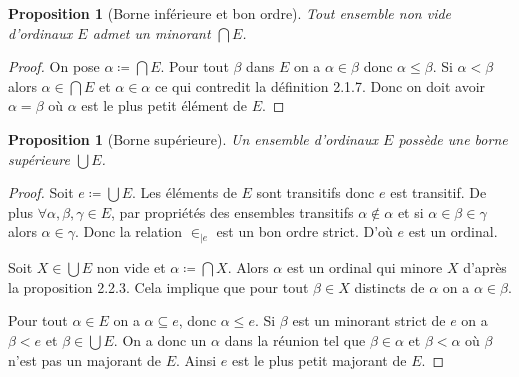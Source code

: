 \documentclass{article}
\theoremstyle{definition}
\theoremstyle{plain}
\newtheorem{proposition}[subsubsection]{Proposition}
\theoremstyle{plain}
\theoremstyle{plain}
\theoremstyle{plain}
\begin{document}
\begin{proposition}[Borne inférieure et bon ordre]
	Tout ensemble non vide d'ordinaux \( E\) admet un minorant \( \bigcap E \).
\end{proposition}
\begin{proof}
	On pose \( \alpha \coloneqq \bigcap E \). Pour tout \( \beta \) dans \( E \) on a \( \alpha \in \beta \) donc \( \alpha \le \beta \). Si \( \alpha < \beta \) alors \( \alpha \in \bigcap E \) et \( \alpha \in \alpha \) ce qui contredit la définition 2.1.7. Donc on doit avoir \( \alpha = \beta \) où \( \alpha \) est le plus petit élément de \( E \).
\end{proof}
\begin{proposition}[Borne supérieure]
	Un ensemble d'ordinaux \( E \) possède une borne supérieure \( \bigcup E \). 
\end{proposition}
\begin{proof}
	Soit \( e \coloneqq \bigcup E \). Les éléments de \( E \) sont transitifs donc \( e \) est transitif. De plus \( \forall \alpha, \beta, \gamma \in E \), par propriétés des ensembles transitifs \( \alpha \notin \alpha  \) et si \( \alpha \in \beta \in \gamma \) alors \( \alpha \in \gamma \). Donc la relation \( \in_{|e} \) est un bon ordre strict. D'où \( e \) est un ordinal.

	Soit \( X \in \bigcup E \) non vide et \( \alpha \coloneqq \bigcap X \). Alors \( \alpha \) est un ordinal qui minore \( X \) d'après la proposition 2.2.3. Cela implique que pour tout \( \beta \in X \) distincts de \( \alpha \) on a \( \alpha \in \beta \). 

	Pour tout \( \alpha \in E \) on a \( \alpha \subseteq e \), donc \( \alpha \le e \). Si \( \beta \) est un minorant strict de \( e \) on a \( \beta < e \) et \( \beta \in \bigcup E \). On a donc un \( \alpha \) dans la réunion tel que \( \beta \in \alpha \) et \( \beta < \alpha \) où \( \beta \) n'est pas un majorant de \( E \). Ainsi \( e \) est le plus petit majorant de \( E \).
\end{proof}
\end{document}
